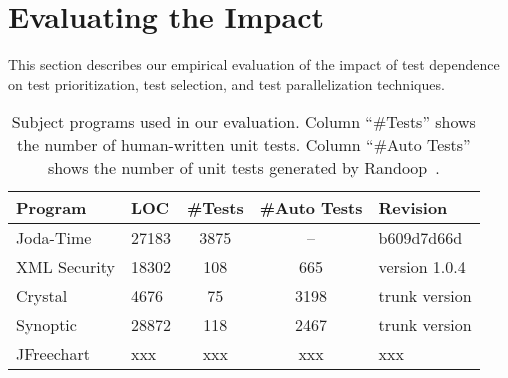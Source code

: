 \section{Evaluating the Impact}

\newcommand{\jt}{Joda-Time\xspace}

\newcommand{\jfreecharttests}{2234\xspace}%
\newcommand{\jodatimetests}{3875\xspace}
\newcommand{\xmlsecuritytests}{108\xspace}
\newcommand{\crystaltests}{75\xspace}
\newcommand{\synoptictests}{118\xspace}
\newcommand{\totaltests}{4176\xspace}

\newcommand{\jfreechartautotests}{2946\xspace}
\newcommand{\jodatimeautotests}{2639\xspace}
\newcommand{\xmlsecurityautotests}{665\xspace}
\newcommand{\crystalautotests}{3198\xspace}
\newcommand{\synopticautotests}{2467\xspace}
\newcommand{\totalautotests}{8969\xspace}

\label{sec:impact}

This section describes our empirical evaluation of
the impact of test dependence on test prioritization,
test selection, and test parallelization techniques.

\begin{table}
\centering
\setlength{\tabcolsep}{0.25\tabcolsep}
\begin{tabular}{|l|l|c|c|l|}
\hline
\textbf{Program} & \textbf{LOC} & \textbf{\#Tests} & \textbf{\#Auto Tests} & \textbf{Revision}
\\
\hline
\jt & 27183 & \jodatimetests
& -- &  b609d7d66d\\
XML Security & 18302 & \xmlsecuritytests & \xmlsecurityautotests& version 1.0.4 \\ 
Crystal & 4676 & \crystaltests & \crystalautotests& trunk version\\
Synoptic & 28872 & \synoptictests & \synopticautotests&  trunk version\\ 
JFreechart& xxx & xxx & xxx &  xxx \\ 
\hline
\end{tabular}
\caption{Subject programs used in our evaluation.
Column ``\#Tests'' shows the number of human-written
unit tests. Column
``\#Auto Tests'' shows the number of 
unit tests generated by Randoop~\cite{PachecoLET2007}.
}
\label{tab:subjects}
\end{table}

